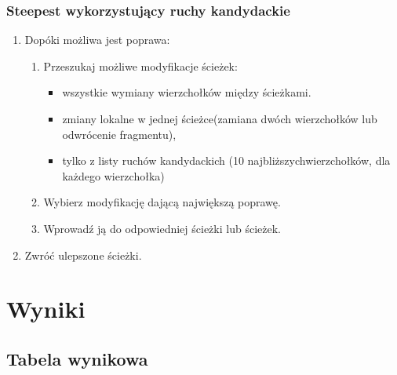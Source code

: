 \documentclass[11pt]{article}
\begin{document}
\subsubsection{Steepest wykorzystujący ruchy kandydackie}

\begin{enumerate}
  \item Dopóki możliwa jest poprawa:
  \begin{enumerate}
    \item Przeszukaj możliwe modyfikacje ścieżek:
    \begin{itemize}
      \item wszystkie wymiany wierzchołków między ścieżkami.
      \item zmiany lokalne w jednej ścieżce(zamiana dwóch wierzchołków lub odwrócenie fragmentu),
      \item tylko z listy ruchów kandydackich (10 najbliższychwierzchołków, dla każdego wierzchołka)
    \end{itemize}
    \item Wybierz modyfikację dającą największą poprawę.
    \item Wprowadź ją do odpowiedniej ścieżki lub ścieżek.
  \end{enumerate}
  \item Zwróć ulepszone ścieżki.
\end{enumerate}

\section{Wyniki}\label{sec:wyniki}

\subsection{Tabela wynikowa}\label{subsec:tabela-wynikowa}

\begin{table}[ht]
\centering
{}
\caption{Wyniki dla \texttt{kroA200}}
\end{table}
\end{document}

